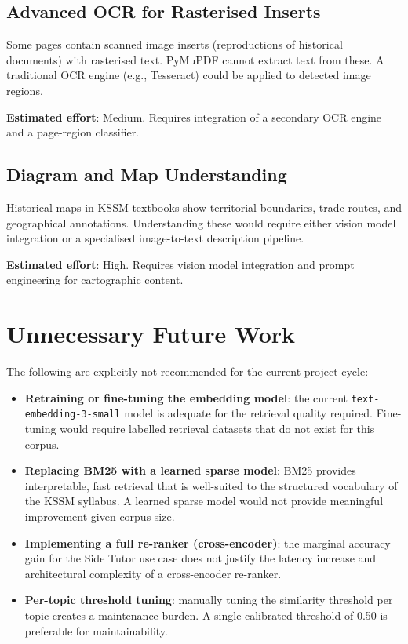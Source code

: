 \documentclass[12pt, a4paper]{report}
\newcommand{\codeinline}[1]{\texttt{#1}}
\begin{document}
\subsection{Advanced OCR for Rasterised Inserts}

Some pages contain scanned image inserts (reproductions of historical documents)
with rasterised text. PyMuPDF cannot extract text from these. A traditional
OCR engine (e.g., Tesseract) could be applied to detected image regions.

\textbf{Estimated effort}: Medium. Requires integration of a secondary OCR
engine and a page-region classifier.

\subsection{Diagram and Map Understanding}

Historical maps in KSSM textbooks show territorial boundaries, trade routes,
and geographical annotations. Understanding these would require either vision
model integration or a specialised image-to-text description pipeline.

\textbf{Estimated effort}: High. Requires vision model integration and
prompt engineering for cartographic content.

\section{Unnecessary Future Work}

The following are explicitly not recommended for the current project cycle:

\begin{itemize}[noitemsep]
  \item \textbf{Retraining or fine-tuning the embedding model}: the current
        \codeinline{text-embedding-3-small} model is adequate for the retrieval
        quality required. Fine-tuning would require labelled retrieval datasets
        that do not exist for this corpus.

  \item \textbf{Replacing BM25 with a learned sparse model}: BM25 provides
        interpretable, fast retrieval that is well-suited to the structured
        vocabulary of the KSSM syllabus. A learned sparse model would not
        provide meaningful improvement given corpus size.

  \item \textbf{Implementing a full re-ranker (cross-encoder)}: the marginal
        accuracy gain for the Side Tutor use case does not justify the latency
        increase and architectural complexity of a cross-encoder re-ranker.

  \item \textbf{Per-topic threshold tuning}: manually tuning the similarity
        threshold per topic creates a maintenance burden. A single calibrated
        threshold of 0.50 is preferable for maintainability.
\end{itemize}
\end{document}
